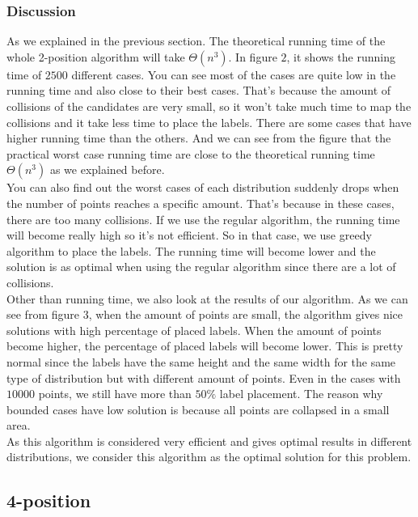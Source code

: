 \documentclass[crop=false,a4paper,oneside,11pt]{standalone}
\begin{document}
\subsubsection{Discussion}
As we explained in the previous section. The theoretical running time of the whole 2-position algorithm will take $\Theta(n^3)$. In figure $2$, it shows the running time of $2500$ different cases. You can see most of the cases are quite low in the running time and also close to their best cases. That's because the amount of collisions of the candidates are very small, so it won't take much time to map the collisions and it take less time to place the labels. There are some cases that have higher running time than the others. And we can see from the figure that the practical worst case running time are close to the theoretical running time $\Theta(n^3)$ as we explained before. \\
You can also find out the worst cases of each distribution suddenly drops when the number of points reaches a specific amount. That's because in these cases, there are too many collisions. If we use the regular algorithm, the running time will become really high so it's not efficient. So in that case, we use greedy algorithm to place the labels. The running time will become lower and the solution is as optimal when using the regular algorithm since there are a lot of collisions.\\
Other than running time, we also look at the results of our algorithm. As we can see from figure $3$, when the amount of points are small, the algorithm gives nice solutions with high percentage of placed labels. When the amount of points become higher, the percentage of placed labels will become lower. This is pretty normal since the labels have the same height and the same width for the same type of distribution but with different amount of points. Even in the cases with $10000$ points, we still have more than $50\%$ label placement. The reason why bounded cases have low solution is because all points are collapsed in a small area.\\
As this algorithm is considered very efficient and gives optimal results in different distributions, we consider this algorithm as the optimal solution for this problem.

\subsection{4-position}
\end{document}
